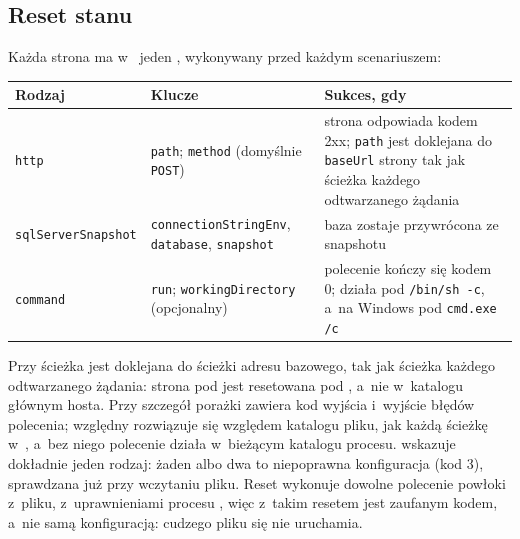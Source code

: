 \subsection{Reset stanu}\label{sec:cli-reset}

Każda strona ma w~ jeden , wykonywany przed każdym
scenariuszem:

{\small
\begin{tabularx}{\linewidth}{@{}>{\raggedright\arraybackslash}p{3cm} >{\raggedright\arraybackslash}p{4.2cm} >{\raggedright\arraybackslash}X@{}}
\toprule
Rodzaj & Klucze & Sukces, gdy \\
\midrule
\texttt{http} & \texttt{path}; \texttt{method} (domyślnie \texttt{POST}) & strona odpowiada
kodem 2xx; \texttt{path} jest doklejana do \texttt{baseUrl} strony tak jak ścieżka każdego
odtwarzanego żądania \\
\texttt{sqlServerSnapshot} & \texttt{connectionStringEnv}, \texttt{database},
\texttt{snapshot} & baza zostaje przywrócona ze snapshotu \\
\texttt{command} & \texttt{run}; \texttt{workingDirectory} (opcjonalny) & polecenie kończy się
kodem 0; działa pod \texttt{/bin/sh -c}, a~na Windows pod \texttt{cmd.exe /c} \\
\bottomrule
\end{tabularx}
}

Przy  ścieżka jest doklejana do ścieżki adresu bazowego, tak jak ścieżka
każdego odtwarzanego żądania: strona pod  jest resetowana pod
, a~nie w~katalogu głównym hosta. Przy  szczegół
porażki zawiera kod wyjścia i~wyjście błędów polecenia; względny
 rozwiązuje się względem katalogu pliku, jak każdą ścieżkę
w~, a~bez niego polecenie działa w~bieżącym katalogu procesu.
 wskazuje dokładnie jeden rodzaj: żaden albo dwa to niepoprawna
konfiguracja (kod 3), sprawdzana już przy wczytaniu pliku. Reset  wykonuje
dowolne polecenie powłoki z~pliku, z~uprawnieniami procesu , więc
 z~takim resetem jest zaufanym kodem, a~nie samą konfiguracją:
cudzego pliku się nie uruchamia.

